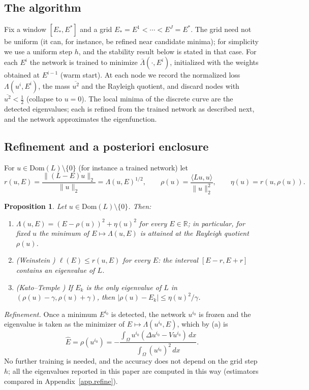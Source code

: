 \documentclass[10pt]{amsart}
\theoremstyle{definition}
\theoremstyle{remark}
\theoremstyle{plain}
\newtheorem{proposition}[theorem]{Proposition}
\newcommand{\R}{\mathbb{R}}
\begin{document}
\subsection{The algorithm}
Fix a window $[E_*,E^*]$ and a grid $E_*=E^1<\cdots<E^J=E^*$. The grid need not be uniform (it can,
for instance, be refined near candidate minima); for simplicity we use a uniform step $h$, and the
stability result below is stated in that case. For each $E^i$ the
network is trained to minimize $\bar\Lambda(\cdot,E^i)$, initialized with the weights obtained at
$E^{i-1}$ (warm start). At each node we record the normalized loss $\Lambda(u^i,E^i)$, the mass
$\overline{u^2}$ and the Rayleigh quotient, and discard nodes with $\overline{u^2}<\frac12$ (collapse to
$u=0$). The local minima of the discrete curve are the detected eigenvalues; each is refined from the
trained network as described next, and the network approximates the eigenfunction.

\subsection{Refinement and a posteriori enclosure}\label{sec.certificate}
For $u\in \mathrm{Dom}(L)\setminus\{0\}$ (for instance a trained network) let
\[
r(u,E)=\frac{\|(L-E)u\|_2}{\|u\|_2}=\Lambda(u,E)^{1/2},\qquad
\rho(u)=\frac{\langle Lu,u\rangle}{\|u\|_2^2},\qquad \eta(u)=r(u,\rho(u)).
\]

\begin{proposition}\label{prop.rayleigh}
Let $u\in \mathrm{Dom}(L)\setminus\{0\}$. Then:
\begin{enumerate}
\item[(a)] $\Lambda(u,E)=(E-\rho(u))^2+\eta(u)^2$ for every $E\in\R$; in particular, for fixed $u$ the
minimum of $E\mapsto\Lambda(u,E)$ is attained at the Rayleigh quotient $\rho(u)$.
\item[(b)] (Weinstein \cite{Weinstein1934,Parlett1998}) $\ell(E)\le r(u,E)$ for every $E$: the interval
$[E-r,E+r]$ contains an eigenvalue of $L$.
\item[(c)] (Kato--Temple \cite{Kato1949,Parlett1998}) If $E_k$ is the only eigenvalue of $L$ in
$(\rho(u)-\gamma,\rho(u)+\gamma)$, then $|\rho(u)-E_k|\le\eta(u)^2/\gamma$.
\end{enumerate}
\end{proposition}

\emph{Refinement.} Once a minimum $E^{i_0}$ is detected, the network $u^{i_0}$ is frozen and the
eigenvalue is taken as the minimizer of $E\mapsto\Lambda(u^{i_0},E)$, which by (a) is
\[
\hat E=\rho(u^{i_0})=-\frac{\int_\Omega u^{i_0}(\Delta u^{i_0}-Vu^{i_0})\,dx}{\int_\Omega (u^{i_0})^2\,dx}.
\]
No further training is needed, and the accuracy does not depend on the grid step $h$; all the
eigenvalues reported in this paper are computed in this way (estimators compared in
Appendix~\ref{app.refine}).
\end{document}
